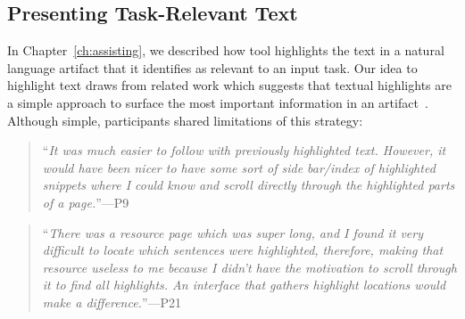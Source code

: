 











\subsection{Presenting Task-Relevant Text}
\label{cp7:info-viz}




In Chapter~\ref{ch:assisting}, we described how \acs{tool}
highlights the text in a natural language artifact that it identifies 
as relevant to an input task. Our idea to highlight text 
draws from related work which suggests that textual highlights 
are a simple approach to surface the most important information in 
an artifact~\cite{Robillard2015,nadi2020}. 
Although simple, participants shared limitations of 
this strategy:



\smallskip
\begin{quote}
``\textit{It was much easier to follow with previously highlighted text.  
    However, it would have been nicer to have some sort of side bar/index of highlighted snippets
    where I could know and scroll directly through the highlighted parts of a page.}''---P9
\end{quote}



\smallskip
\begin{quote}
``\textit{There was a resource page which was super long, and I found it very difficult to locate which sentences were highlighted, therefore, making that resource useless to me because I didn't have the motivation to scroll through it to find all highlights. An interface that gathers highlight locations would make a difference.}''---P21
\end{quote}


